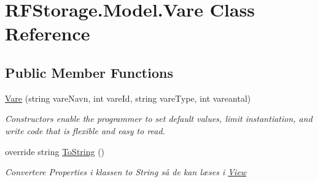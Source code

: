 \hypertarget{class_r_f_storage_1_1_model_1_1_vare}{}\section{R\+F\+Storage.\+Model.\+Vare Class Reference}
\label{class_r_f_storage_1_1_model_1_1_vare}
\subsection*{Public Member Functions}
\begin{DoxyCompactItemize}
\item 
\mbox{\hyperlink{class_r_f_storage_1_1_model_1_1_vare_ae105d8d34d634a8f033810cd548f46c7}{Vare}} (string vare\+Navn, int vare\+Id, string vare\+Type, int vareantal)
\begin{DoxyCompactList}\small\item\em Constructors enable the programmer to set default values, limit instantiation, and write code that is flexible and easy to read. \end{DoxyCompactList}\item 
override string \mbox{\hyperlink{class_r_f_storage_1_1_model_1_1_vare_a461e3a920334da322619e2857a5f6bc4}{To\+String}} ()
\begin{DoxyCompactList}\small\item\em Convertere Properties i klassen to String så de kan læses i \mbox{\hyperlink{namespace_r_f_storage_1_1_view}{View}} \end{DoxyCompactList}\end{DoxyCompactItemize}
